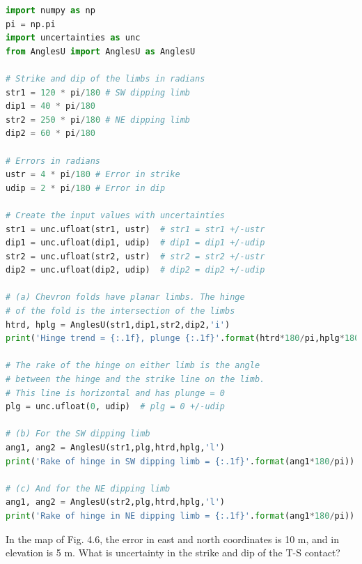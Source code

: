 \documentclass[a4paper , 12pt]{book}
\begin{document}
\begin{center}
\begin{lstlisting}[language=Python, frame=single]
import numpy as np
pi = np.pi
import uncertainties as unc
from AnglesU import AnglesU as AnglesU

# Strike and dip of the limbs in radians
str1 = 120 * pi/180 # SW dipping limb
dip1 = 40 * pi/180
str2 = 250 * pi/180 # NE dipping limb
dip2 = 60 * pi/180

# Errors in radians
ustr = 4 * pi/180 # Error in strike
udip = 2 * pi/180 # Error in dip

# Create the input values with uncertainties
str1 = unc.ufloat(str1, ustr)  # str1 = str1 +/-ustr
dip1 = unc.ufloat(dip1, udip)  # dip1 = dip1 +/-udip
str2 = unc.ufloat(str2, ustr)  # str2 = str2 +/-ustr
dip2 = unc.ufloat(dip2, udip)  # dip2 = dip2 +/-udip

# (a) Chevron folds have planar limbs. The hinge
# of the fold is the intersection of the limbs
htrd, hplg = AnglesU(str1,dip1,str2,dip2,'i')
print('Hinge trend = {:.1f}, plunge {:.1f}'.format(htrd*180/pi,hplg*180/pi))

# The rake of the hinge on either limb is the angle 
# between the hinge and the strike line on the limb. 
# This line is horizontal and has plunge = 0
plg = unc.ufloat(0, udip)  # plg = 0 +/-udip

# (b) For the SW dipping limb
ang1, ang2 = AnglesU(str1,plg,htrd,hplg,'l')
print('Rake of hinge in SW dipping limb = {:.1f}'.format(ang1*180/pi))

# (c) And for the NE dipping limb
ang1, ang2 = AnglesU(str2,plg,htrd,hplg,'l')
print('Rake of hinge in NE dipping limb = {:.1f}'.format(ang1*180/pi))
\end{lstlisting}
\end{center}

In the map of Fig. 4.6, the error in east and north coordinates is 10 m, and in elevation is 5 m. What is uncertainty in the strike and dip of the T-S contact? 
\end{document}

